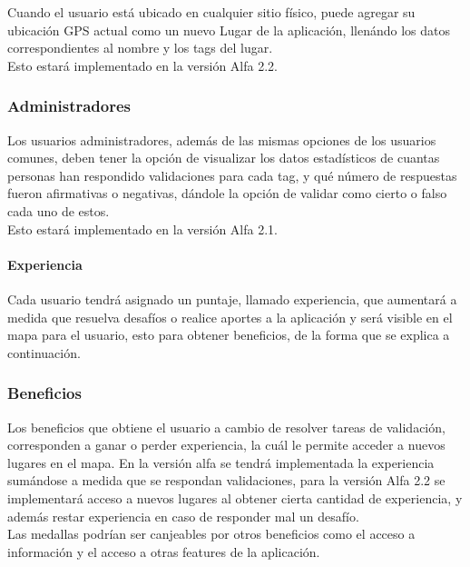 \documentclass[10pt,letterpaper]{article}
\begin{document}
Cuando el usuario está ubicado en cualquier sitio físico, puede agregar su ubicación GPS actual como un nuevo Lugar de la aplicación, llenándo los datos correspondientes al nombre y los tags del lugar.\\

Esto estará implementado en la versión Alfa 2.2.\\

\subsubsection{Administradores}

Los usuarios administradores, además de las mismas opciones de los usuarios comunes, deben tener la opción de visualizar los datos estadísticos de cuantas personas han respondido validaciones para cada tag, y qué número de respuestas fueron afirmativas o negativas, dándole la opción de validar como cierto o falso cada uno de estos.\\

Esto estará implementado en la versión Alfa 2.1.\\

\paragraph{Experiencia}

Cada usuario tendrá asignado un puntaje, llamado experiencia, que aumentará a medida que resuelva desafíos o realice aportes a la aplicación y será visible en el mapa para el usuario, esto para obtener beneficios, de la forma que se explica a continuación.\\

\subsubsection{Beneficios}

Los beneficios que obtiene el usuario a cambio de resolver tareas de validación, corresponden a ganar o perder experiencia, la cuál le permite acceder a nuevos lugares en el mapa. En la versión alfa se tendrá implementada la experiencia sumándose a medida que se respondan validaciones, para la versión Alfa 2.2 se implementará acceso a nuevos lugares al obtener cierta cantidad de experiencia, y además restar experiencia en caso de responder mal un desafío.\\
Las medallas podrían ser canjeables por otros beneficios como el acceso a información y el acceso a otras features de la aplicación.\\
\end{document}
